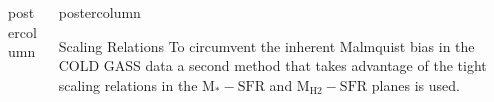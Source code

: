 \documentclass{beamer}
\newlength{\columnheight}
\begin{document}
\begin{frame}
\begin{columns}
\begin{column}{.5\textwidth}
\begin{beamercolorbox}[center,wd=\textwidth]{postercolumn}
\begin{minipage}[T]{.95\textwidth}
{%
		}\end{minipage}\end{beamercolorbox}
	\end{column}
	\begin{column}{.5\textwidth}
		\begin{beamercolorbox}[center,wd=\textwidth]{postercolumn}
			\begin{minipage}[T]{.95\textwidth} %
				\parbox[t][\columnheight]{\textwidth}{ %

					\begin{myblock}{\LARGE Scaling Relations}
            To circumvent the inherent Malmquist bias in the COLD GASS data a
            second method that takes advantage of the tight scaling relations
            in the $\mathrm{M_{*}-SFR}$ \citep{saintonge2016SFRMstar} and
            $\mathrm{M_{H2}-SFR}$ planes is used.\vspace{1ex}


\end{myblock}}
\end{minipage}
\end{beamercolorbox}
\end{column}
\end{columns}
\end{frame}
\end{document}
